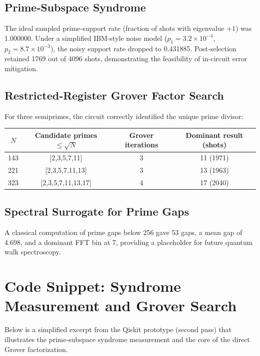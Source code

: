 \documentclass[12pt,a4paper]{article}
\begin{document}
\subsection{Prime‑Subspace Syndrome}
The ideal sampled prime‑support rate (fraction of shots with eigenvalue \(+1\)) was 1.000000. Under a simplified IBM‑style noise model (\(p_1 = 3.2\times10^{-4}\), \(p_2 = 8.7\times10^{-3}\)), the noisy support rate dropped to 0.431885. Post‑selection retained 1769 out of 4096 shots, demonstrating the feasibility of in‑circuit error mitigation.

\subsection{Restricted‑Register Grover Factor Search}
For three semiprimes, the circuit correctly identified the unique prime divisor:
\begin{center}
\begin{tabular}{c|c|c|c}
\(N\) & Candidate primes \(\le\sqrt{N}\) & Grover iterations & Dominant result (shots) \\
\hline
143 & [2,3,5,7,11] & 3 & 11 (1971) \\
221 & [2,3,5,7,11,13] & 3 & 13 (1963) \\
323 & [2,3,5,7,11,13,17] & 4 & 17 (2040) \\
\end{tabular}
\end{center}

\subsection{Spectral Surrogate for Prime Gaps}
A classical computation of prime gaps below 256 gave 53 gaps, a mean gap of 4.698, and a dominant FFT bin at 7, providing a placeholder for future quantum walk spectroscopy.

\section{Code Snippet: Syndrome Measurement and Grover Search}

Below is a simplified excerpt from the Qiskit prototype (second pass) that illustrates the prime‑subspace syndrome measurement and the core of the direct Grover factorization.
\end{document}
